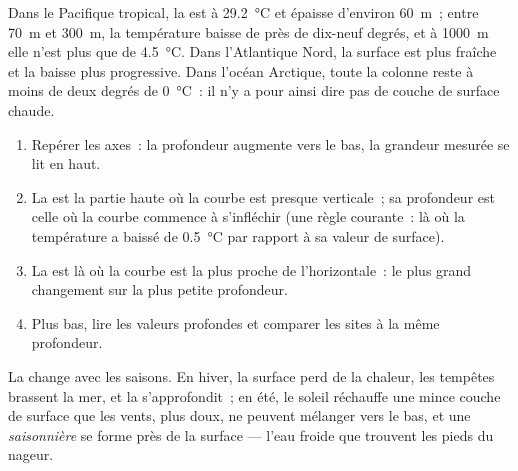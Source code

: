 Dans le Pacifique tropical, la  est à
\qty{29.2}{\degreeCelsius} et épaisse d'environ \qty{60}{m}~; entre
\qty{70}{m} et \qty{300}{m}, la température baisse de près de dix-neuf
degrés, et à \qty{1000}{m} elle n'est plus que de \qty{4.5}{\degreeCelsius}.
Dans l'Atlantique Nord, la surface est plus fraîche et la baisse plus
progressive. Dans l'océan Arctique, toute la colonne reste à moins de deux
degrés de \qty{0}{\degreeCelsius}~: il n'y a pour ainsi dire pas de couche
de surface chaude.

\begin{method}\label{met:g10:layered-ocean:profile}
\begin{enumerate}
  \item Repérer les axes~: la profondeur augmente vers le bas, la grandeur
        mesurée se lit en haut.
  \item La  est la partie haute où la courbe est presque
        verticale~; sa profondeur est celle où la courbe commence à
        s'infléchir (une règle courante~: là où la température a baissé de
        \qty{0.5}{\degreeCelsius} par rapport à sa valeur de surface).
  \item La  est là où la courbe est la plus proche de
        l'horizontale~: le plus grand changement sur la plus petite
        profondeur.
  \item Plus bas, lire les valeurs profondes et comparer les sites à la même
        profondeur.
\end{enumerate}
\end{method}

La  change avec les saisons. En hiver, la surface perd de
la chaleur, les tempêtes brassent la mer, et la 
s'approfondit~; en été, le soleil réchauffe une mince couche de surface que
les vents, plus doux, ne peuvent mélanger vers le bas, et une
\emph{ saisonnière} se forme près de la surface --- l'eau froide
que trouvent les pieds du nageur.

